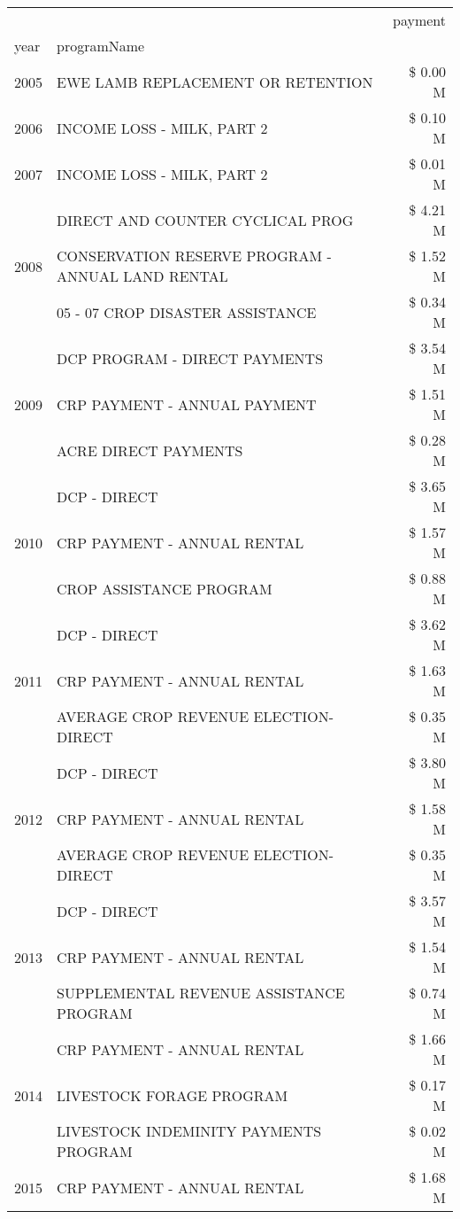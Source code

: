 \begin{tabular}{llr}
\toprule
 &  & payment \\
year & programName &  \\
\midrule
2005 & EWE LAMB REPLACEMENT OR RETENTION & \$ 0.00 M \\
\cline{1-3}
2006 & INCOME LOSS - MILK, PART 2 & \$ 0.10 M \\
\cline{1-3}
2007 & INCOME LOSS - MILK, PART 2 & \$ 0.01 M \\
\cline{1-3}
\multirow[t]{3}{*}{2008} & DIRECT AND COUNTER CYCLICAL PROG & \$ 4.21 M \\
 & CONSERVATION RESERVE PROGRAM - ANNUAL LAND RENTAL & \$ 1.52 M \\
 & 05 - 07 CROP DISASTER ASSISTANCE & \$ 0.34 M \\
\cline{1-3}
\multirow[t]{3}{*}{2009} & DCP PROGRAM - DIRECT PAYMENTS & \$ 3.54 M \\
 & CRP PAYMENT - ANNUAL PAYMENT & \$ 1.51 M \\
 & ACRE DIRECT PAYMENTS & \$ 0.28 M \\
\cline{1-3}
\multirow[t]{3}{*}{2010} & DCP - DIRECT & \$ 3.65 M \\
 & CRP PAYMENT - ANNUAL RENTAL & \$ 1.57 M \\
 & CROP ASSISTANCE PROGRAM & \$ 0.88 M \\
\cline{1-3}
\multirow[t]{3}{*}{2011} & DCP - DIRECT & \$ 3.62 M \\
 & CRP PAYMENT - ANNUAL RENTAL & \$ 1.63 M \\
 & AVERAGE CROP REVENUE ELECTION-DIRECT & \$ 0.35 M \\
\cline{1-3}
\multirow[t]{3}{*}{2012} & DCP - DIRECT & \$ 3.80 M \\
 & CRP PAYMENT - ANNUAL RENTAL & \$ 1.58 M \\
 & AVERAGE CROP REVENUE ELECTION-DIRECT & \$ 0.35 M \\
\cline{1-3}
\multirow[t]{3}{*}{2013} & DCP - DIRECT & \$ 3.57 M \\
 & CRP PAYMENT - ANNUAL RENTAL & \$ 1.54 M \\
 & SUPPLEMENTAL REVENUE ASSISTANCE PROGRAM & \$ 0.74 M \\
\cline{1-3}
\multirow[t]{3}{*}{2014} & CRP PAYMENT - ANNUAL RENTAL & \$ 1.66 M \\
 & LIVESTOCK FORAGE PROGRAM & \$ 0.17 M \\
 & LIVESTOCK INDEMINITY PAYMENTS PROGRAM & \$ 0.02 M \\
\cline{1-3}
\multirow[t]{3}{*}{2015} & CRP PAYMENT - ANNUAL RENTAL & \$ 1.68 M \\

\end{tabular}
